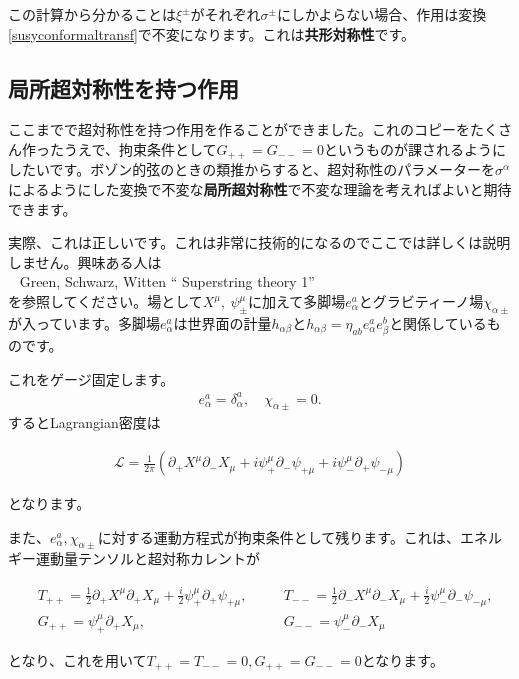 \documentclass[report,paper=a4, fontsize=12pt, line_length=16cm, number_of_lines=33,dvipdfmx]{jlreq}
\newenvironment{important}{\begin{tcolorbox}[
  colback = white,
  colframe = red!35,
  boxrule = 2mm,
  fonttitle = \bfseries,
  after = \noindent] }{\end{tcolorbox}}
\newenvironment{mycite}{\\ \qquad \textbullet\ }{\\}
\numberwithin{equation}{chapter}
\numberwithin{equation}{section}
\newcommand{\del}{\partial}
\newcommand{\kyou}[1]{{\sffamily \bfseries #1}}
\newcommand{\Lcal}{\mathcal{L}}
\begin{document}
この計算から分かることは$\xi^{\pm}$がそれぞれ$\sigma^{\pm}$にしかよらない場合、作用は変換\eqref{susyconformaltransf}で不変になります。これは\kyou{共形対称性}です。

\subsection{局所超対称性を持つ作用}
ここまでで超対称性を持つ作用を作ることができました。これのコピーをたくさん作ったうえで、拘束条件として$G_{++}=G_{--}=0$というものが課されるようにしたいです。ボゾン的弦のときの類推からすると、超対称性のパラメーターを$\sigma^{\alpha}$によるようにした変換で不変な\kyou{局所超対称性}で不変な理論を考えればよいと期待できます。

実際、これは正しいです。これは非常に技術的になるのでここでは詳しくは説明しません。興味ある人は
\begin{mycite}
  Green, Schwarz, Witten `` Superstring theory 1''
\end{mycite}
を参照してください。場として$X^{\mu},\ \psi^{\mu}_{\pm}$に加えて多脚場$e^{a}_{\alpha}$とグラビティーノ場$\chi_{\alpha \pm}$が入っています。多脚場$e^{a}_{\alpha}$は世界面の計量$h_{\alpha\beta}$と$h_{\alpha\beta}=\eta_{ab}e^{a}_{\alpha}e^{b}_{\beta}$と関係しているものです。

これをゲージ固定します。
\begin{align}
  e^{a}_{\alpha}=\delta^{a}_{\alpha},\quad \chi_{\alpha \pm}=0.
\end{align}
するとLagrangian密度は
\begin{important}
  \begin{align}
    \Lcal = \frac{1}{2\pi}\left( 
      \del_{+}X^{\mu}\del_{-}X_{\mu}+i\psi^{\mu}_{+}\del_{-}\psi_{+\mu}
      +i\psi^{\mu}_{-}\del_{+}\psi_{-\mu}
     \right)
     \label{supergaugefixedaction}
  \end{align}    
\end{important}
となります。

また、$e^{a}_{\alpha},\chi_{\alpha\pm}$に対する運動方程式が拘束条件として残ります。これは、エネルギー運動量テンソルと超対称カレントが
\begin{important}
  \begin{align}
    &T_{++}=\frac12\del_{+}X^{\mu}\del_{+}X_{\mu}+\frac{i}{2}\psi^{\mu}_{+}\del_{+}\psi_{+\mu},\quad &&
  T_{--}=\frac12\del_{-}X^{\mu}\del_{-}X_{\mu}+\frac{i}{2}\psi^{\mu}_{-}\del_{-}\psi_{-\mu},\nonumber\\
  &G_{++}=\psi^{\mu}_{+}\del_{+}X_{\mu},&&
  G_{--}=\psi^{\mu}_{-}\del_{-}X_{\mu}
  \end{align}    
\end{important}
となり、これを用いて$T_{++}=T_{--}=0,G_{++}=G_{--}=0$となります。
\end{document}
